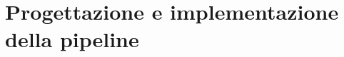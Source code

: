 \chapter{Progettazione e implementazione della pipeline}
\label{ch:progettazione_pipeline}









